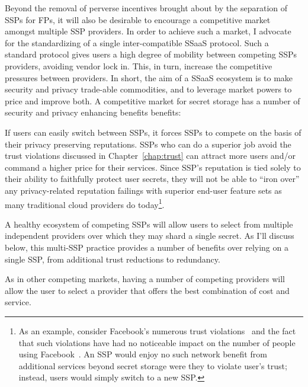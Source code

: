 Beyond the removal of perverse incentives brought about by the
separation of SSPs for FPs, it will also be desirable to encourage a
competitive market amongst multiple SSP providers. In order to achieve
such a market, I advocate for the standardizing of a single
inter-compatible SSaaS protocol. Such a standard protocol gives users
a high degree of mobility between competing SSPs providers, avoiding
vendor lock in. This, in turn, increase the competitive pressures
between providers. In short, the aim of a SSaaS ecosystem is to make
security and privacy trade-able commodities, and to leverage market
powers to price and improve both. A competitive market for secret
storage has a number of security and privacy enhancing benefits
benefits:

\begin{packed_desc}
\item[Reputation] If users can easily switch between SSPs, it forces
  SSPs to compete on the basis of their privacy preserving
  reputations. SSPs who can do a superior job avoid the trust
  violations discussed in Chapter~\ref{chap:trust} can attract more
  users and/or command a higher price for their services. Since SSP's
  reputation is tied solely to their ability to faithfully protect
  user secrets, they will not be able to ``iron over'' any
  privacy-related reputation failings with superior end-user feature
  sets as many traditional cloud providers do today\footnote{As an
    example, consider Facebook's numerous trust
    violations~\cite{goel2014, lomas2014, tsukayama2014} and the fact
    that such violations have had no noticeable impact on the number
    of people using Facebook~\cite{foster2014}. An SSP would enjoy no
    such network benefit from additional services beyond secret
    storage were they to violate user's trust; instead, users would
    simply switch to a new SSP.}.
\item[Multiple Providers] A healthy ecosystem of competing SSPs will
  allow users to select from multiple independent providers over which
  they may shard a single secret. As I'll discuss below, this
  multi-SSP practice provides a number of benefits over relying on a
  single SSP, from additional trust reductions to redundancy.
\item[Cost] As in other competing markets, having a number of
  competing providers will allow the user to select a provider that
  offers the best combination of cost and service.
\end{packed_desc}

